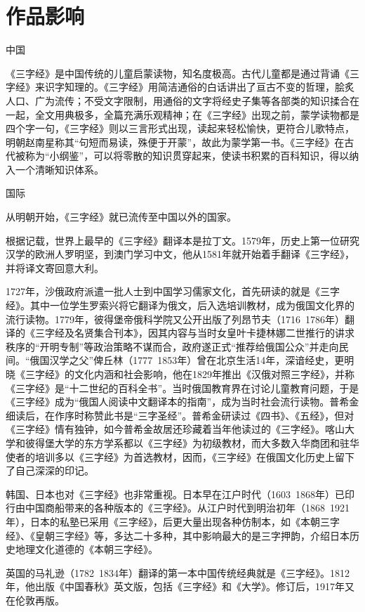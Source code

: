 \documentclass[a4paper,12pt,UTF8,twoside]{ctexbook}
\begin{document}
\chapter{作品影响}

中国

《三字经》是中国传统的儿童启蒙读物，知名度极高。古代儿童都是通过背诵《三字经》来识字知理的。《三字经》用简洁通俗的白话讲出了亘古不变的哲理，脍炙人口、广为流传；不受文字限制，用通俗的文字将经史子集等各部类的知识揉合在一起，全文用典极多，全篇充满乐观精神；在《三字经》出现之前，蒙学读物都是四个字一句，《三字经》则以三言形式出现，读起来轻松愉快，更符合儿歌特点，明朝赵南星称其“句短而易读，殊便于开蒙”，故此为蒙学第一书。《三字经》在古代被称为“小纲鉴”，可以将零散的知识贯穿起来，使读书积累的百科知识，得以纳入一个清晰知识体系。

国际

从明朝开始，《三字经》就已流传至中国以外的国家。

根据记载，世界上最早的《三字经》翻译本是拉丁文。1579年，历史上第一位研究汉学的欧洲人罗明坚，到澳门学习中文，他从1581年就开始着手翻译《三字经》，并将译文寄回意大利。

1727年，沙俄政府派遣一批人士到中国学习儒家文化，首先研读的就是《三字经》。其中一位学生罗索兴将它翻译为俄文，后入选培训教材，成为俄国文化界的流行读物。1779年，彼得堡帝俄科学院又公开出版了列昂节夫（1716~1786年）翻译的《三字经及名贤集合刊本》，因其内容与当时女皇叶卡捷林娜二世推行的讲求秩序的“开明专制”等政治策略不谋而合，政府遂正式“推荐给俄国公众”并走向民间。“俄国汉学之父”俾丘林（1777~1853年）曾在北京生活14年，深谙经史，更明晓《三字经》的文化内涵和社会影响，他在1829年推出《汉俄对照三字经》，并称《三字经》是“十二世纪的百科全书”。当时俄国教育界在讨论儿童教育问题，于是《三字经》成为“俄国人阅读中文翻译本的指南”，成为当时社会流行读物。普希金细读后，在作序时称赞此书是“三字圣经”。普希金研读过《四书》、《五经》，但对《三字经》情有独钟，如今普希金故居还珍藏着当年他读过的《三字经》。喀山大学和彼得堡大学的东方学系都以《三字经》为初级教材，而大多数入华商团和驻华使者的培训多以《三字经》为首选教材，因而，《三字经》在俄国文化历史上留下了自己深深的印记。

韩国、日本也对《三字经》也非常重视。日本早在江户时代（1603~1868年）已印行由中国商船带来的各种版本的《三字经》。从江户时代到明治初年（1868~1921年），日本的私塾已采用《三字经》，后更大量出现各种仿制本，如《本朝三字经》、《皇朝三字经》等，多达二十多种，其中影响最大的是三字押韵，介绍日本历史地理文化道德的《本朝三字经》。

英国的马礼逊（1782~1834年）翻译的第一本中国传统经典就是《三字经》。1812年，他出版《中国春秋》英文版，包括《三字经》和《大学》。修订后，1917年又在伦敦再版。
\end{document}
